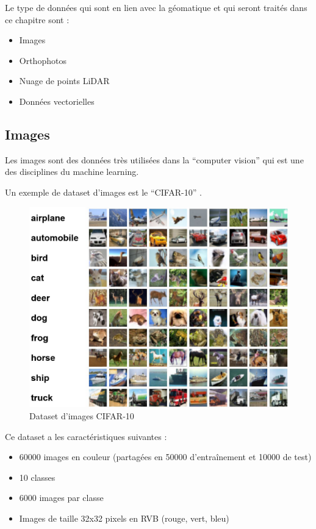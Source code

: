 Le type de données qui sont en lien avec la géomatique et qui seront traités dans ce chapitre sont :
\begin{itemize}
    \item Images
    \item Orthophotos
    \item Nuage de points LiDAR
    \item Données vectorielles
\end{itemize}

\newpage
\subsection{Images}

Les images sont des données très utilisées dans la ``computer vision'' qui est une des disciplines du machine learning.

Un exemple de dataset d'images est le ``CIFAR-10'' \cite{krizhevsky_learning_2009}.

\begin{figure}[H]
    \centering
    \includegraphics[width=0.9\linewidth]{03-tail//A1_fondamentaux_ML//A1_figures/A1_09_cifar.png}
    \caption{Dataset d'images CIFAR-10 \cite{krizhevsky_cifar-10_nodate}}
    \label{fig:A1_09_cifar}
\end{figure}

Ce dataset a les caractéristiques suivantes :
\begin{itemize}
    \item 60000 images en couleur (partagées en 50000 d'entraînement et 10000 de test)
    \item 10 classes
    \item 6000 images par classe
    \item Images de taille 32x32 pixels en RVB (rouge, vert, bleu)
\end{itemize}

